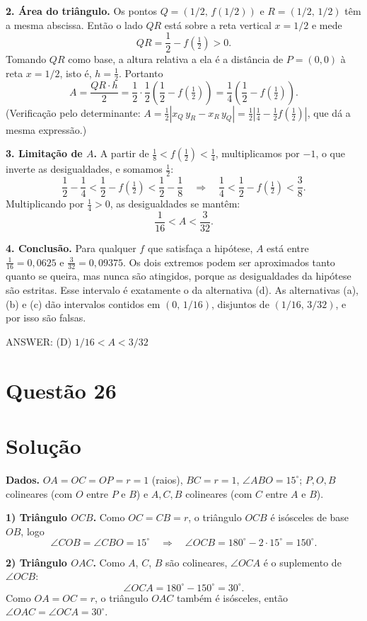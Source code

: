 \documentclass{article}%
\begin{document}
\textbf{2. Área do triângulo.} Os pontos $Q=(1/2,\,f(1/2))$ e $R=(1/2,\,1/2)$ têm a mesma abscissa. Então o lado $QR$ está sobre a reta vertical $x=1/2$ e mede
\[
QR=\frac12-f\!\left(\tfrac12\right)>0 .
\]
Tomando $QR$ como base, a altura relativa a ela é a distância de $P=(0,0)$ à reta $x=1/2$, isto é, $h=\tfrac12$. Portanto
\[
A=\frac{QR\cdot h}{2}=\frac12\cdot\frac12\left(\frac12-f\!\left(\tfrac12\right)\right)=\frac14\left(\frac12-f\!\left(\tfrac12\right)\right).
\]
(Verificação pelo determinante: $A=\tfrac12\left|x_Q\,y_R-x_R\,y_Q\right|=\tfrac12\left|\tfrac14-\tfrac12 f(\tfrac12)\right|$, que dá a mesma expressão.)

\textbf{3. Limitação de $A$.} A partir de $\tfrac18<f(\tfrac12)<\tfrac14$, multiplicamos por $-1$, o que inverte as desigualdades, e somamos $\tfrac12$:
\[
\frac12-\frac14<\frac12-f\!\left(\tfrac12\right)<\frac12-\frac18
\quad\Longrightarrow\quad
\frac14<\frac12-f\!\left(\tfrac12\right)<\frac38 .
\]
Multiplicando por $\tfrac14>0$, as desigualdades se mantêm:
\[
\frac1{16}<A<\frac3{32}.
\]

\textbf{4. Conclusão.} Para qualquer $f$ que satisfaça a hipótese, $A$ está entre $\tfrac1{16}=0{,}0625$ e $\tfrac3{32}=0{,}09375$. Os dois extremos podem ser aproximados tanto quanto se queira, mas nunca são atingidos, porque as desigualdades da hipótese são estritas. Esse intervalo é exatamente o da alternativa (d). As alternativas (a), (b) e (c) dão intervalos contidos em $(0,\,1/16)$, disjuntos de $(1/16,\,3/32)$, e por isso são falsas.

ANSWER: (D) $1/16<A<3/32$%
\newpage%
\section*{Questão 26}

\section*{Solução}

\textbf{Dados.} $OA=OC=OP=r=1$ (raios), $BC=r=1$, $\angle ABO=15^\circ$; $P,O,B$ colineares (com $O$ entre $P$ e $B$) e $A,C,B$ colineares (com $C$ entre $A$ e $B$).

\textbf{1) Triângulo $OCB$.} Como $OC=CB=r$, o triângulo $OCB$ é isósceles de base $OB$, logo
\[
\angle COB=\angle CBO=15^\circ \quad\Longrightarrow\quad \angle OCB=180^\circ-2\cdot 15^\circ=150^\circ .
\]

\textbf{2) Triângulo $OAC$.} Como $A$, $C$, $B$ são colineares, $\angle OCA$ é o suplemento de $\angle OCB$:
\[
\angle OCA=180^\circ-150^\circ=30^\circ .
\]
Como $OA=OC=r$, o triângulo $OAC$ também é isósceles, então $\angle OAC=\angle OCA=30^\circ$.
\end{document}
